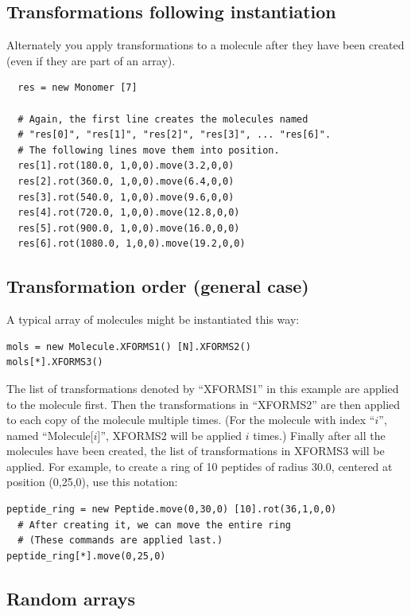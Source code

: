 \documentclass[11pt]{article}
\begin{document}
\subsection{Transformations following instantiation}
\label{sec:xform_after_instance}
Alternately you apply transformations to a molecule 
after they have been created (even if they are part of an array).
\begin{verbatim}
  res = new Monomer [7]

  # Again, the first line creates the molecules named 
  # "res[0]", "res[1]", "res[2]", "res[3]", ... "res[6]".
  # The following lines move them into position.
  res[1].rot(180.0, 1,0,0).move(3.2,0,0)
  res[2].rot(360.0, 1,0,0).move(6.4,0,0)
  res[3].rot(540.0, 1,0,0).move(9.6,0,0)
  res[4].rot(720.0, 1,0,0).move(12.8,0,0)
  res[5].rot(900.0, 1,0,0).move(16.0,0,0)
  res[6].rot(1080.0, 1,0,0).move(19.2,0,0)
\end{verbatim}

\subsection{Transformation order (general case)}
\label{sec:xform_order}
A typical array of molecules might be instantiated this way:
\begin{verbatim}
mols = new Molecule.XFORMS1() [N].XFORMS2()
mols[*].XFORMS3()
\end{verbatim}
The list of transformations denoted by ``XFORMS1'' in this example
are applied to the molecule first.
Then the transformations in ``XFORMS2'' are then applied to each
copy of the molecule multiple times.  
(For the molecule with index ``$i$'', named ``Molecule[$i$]'',
XFORMS2 will be applied $i$ times.)
Finally after all the molecules have been created, the list
of transformations in XFORMS3 will be applied.
For example, to create a ring of 10 peptides of radius 30.0, 
centered at position (0,25,0), use this notation:
\begin{verbatim}
peptide_ring = new Peptide.move(0,30,0) [10].rot(36,1,0,0)
  # After creating it, we can move the entire ring 
  # (These commands are applied last.)
peptide_ring[*].move(0,25,0)
\end{verbatim}


\subsection{Random arrays}
\label{sec:random_arrays}
\end{document}
